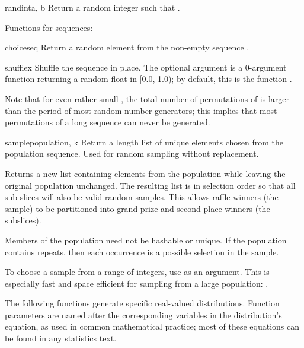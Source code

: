 \begin{funcdesc}{randint}{a, b}
  Return a random integer  such that
  .
\end{funcdesc}


Functions for sequences:

\begin{funcdesc}{choice}{seq}
  Return a random element from the non-empty sequence .
\end{funcdesc}

\begin{funcdesc}{shuffle}{x}
  Shuffle the sequence  in place.
  The optional argument  is a 0-argument function
  returning a random float in [0.0, 1.0); by default, this is the
  function .

  Note that for even rather small , the total
  number of permutations of  is larger than the period of most
  random number generators; this implies that most permutations of a
  long sequence can never be generated.
\end{funcdesc}

\begin{funcdesc}{sample}{population, k}
  Return a  length list of unique elements chosen from the
  population sequence.  Used for random sampling without replacement.

  Returns a new list containing elements from the population while
  leaving the original population unchanged.  The resulting list is
  in selection order so that all sub-slices will also be valid random
  samples.  This allows raffle winners (the sample) to be partitioned
  into grand prize and second place winners (the subslices).

  Members of the population need not be hashable or unique.  If the
  population contains repeats, then each occurrence is a possible
  selection in the sample.

  To choose a sample from a range of integers, use 
  as an argument.  This is especially fast and space efficient for
  sampling from a large population:  .
\end{funcdesc}


The following functions generate specific real-valued distributions.
Function parameters are named after the corresponding variables in the
distribution's equation, as used in common mathematical practice; most of
these equations can be found in any statistics text.


